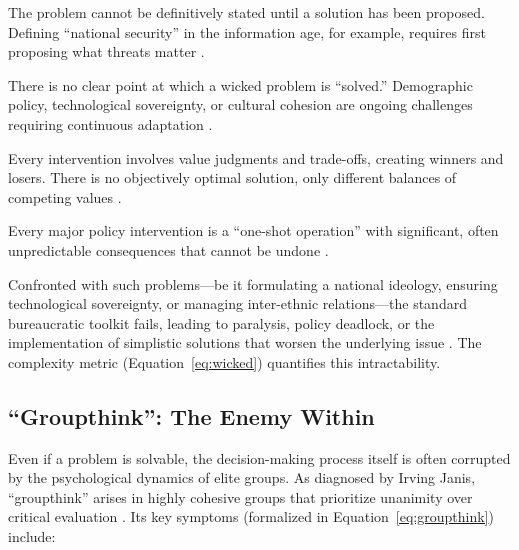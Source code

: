 \documentclass[11pt,a4paper]{article}
\begin{document}
\begin{description}[style=nextline]
    \item[\textbf{Ambiguous Definition}] The problem cannot be definitively stated until a solution has been proposed. Defining ``national security'' in the information age, for example, requires first proposing what threats matter \citep[lines 556--557, 743--744]{AnalyticalReport2025}.
    
    \item[\textbf{No Stopping Rule}] There is no clear point at which a wicked problem is ``solved.'' Demographic policy, technological sovereignty, or cultural cohesion are ongoing challenges requiring continuous adaptation \citep[lines 556--557, 745--746]{AnalyticalReport2025}.
    
    \item[\textbf{Solutions are ``Good/Bad,'' not ``True/False''}] Every intervention involves value judgments and trade-offs, creating winners and losers. There is no objectively optimal solution, only different balances of competing values \citep[lines 556--557, 747--748]{AnalyticalReport2025}.
    
    \item[\textbf{High Stakes and Irreversibility}] Every major policy intervention is a ``one-shot operation'' with significant, often unpredictable consequences that cannot be undone \citep[lines 556--557, 752--753]{AnalyticalReport2025}.
\end{description}

Confronted with such problems—be it formulating a national ideology, ensuring technological sovereignty, or managing inter-ethnic relations—the standard bureaucratic toolkit fails, leading to paralysis, policy deadlock, or the implementation of simplistic solutions that worsen the underlying issue \citep[lines 536, 1137--1145, 1363--1364, 1951--1953]{AnalyticalReport2025}. The complexity metric (Equation~\eqref{eq:wicked}) quantifies this intractability.

\subsection{``Groupthink'': The Enemy Within}
Even if a problem is solvable, the decision-making process itself is often corrupted by the psychological dynamics of elite groups. As diagnosed by Irving Janis, ``groupthink'' arises in highly cohesive groups that prioritize unanimity over critical evaluation \citep[lines 540--541, 585--587]{AnalyticalReport2025}. Its key symptoms (formalized in Equation~\eqref{eq:groupthink}) include:
\end{document}
